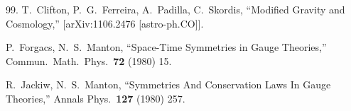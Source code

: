 \documentclass[prd,reprint,eqsecnum,nofootinbib]{revtex4-1}
\begin{document}
\begin{thebibliography}{99.}
  T.~Clifton, P.~G.~Ferreira, A.~Padilla, C.~Skordis,
 ``Modified Gravity and Cosmology,''
  [arXiv:1106.2476 [astro-ph.CO]].

  P.~Forgacs, N.~S.~Manton,
  ``Space-Time Symmetries in Gauge Theories,''
  Commun.\ Math.\ Phys.\  {\bf 72 } (1980)  15.

  R.~Jackiw, N.~S.~Manton,
  ``Symmetries And Conservation Laws In Gauge Theories,''
  Annals Phys.\  {\bf 127 } (1980)  257.

\end{thebibliography}
\end{document}
